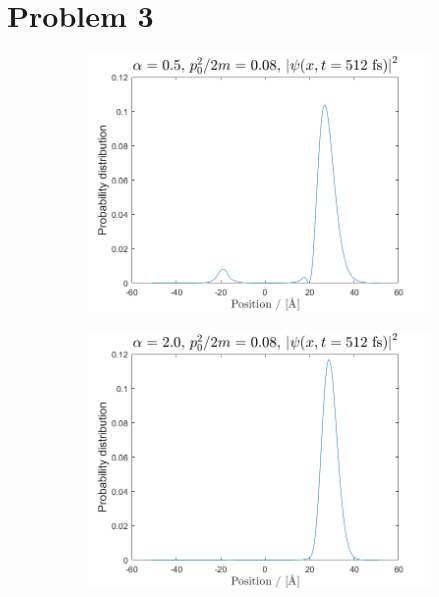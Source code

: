 \section*{Problem 3}

\begin{figure}[H]

\centering
\begin{subfigure}[t]{0.47\textwidth}
	\includegraphics[width=\textwidth]{graphics/task3/a1e1.png}
	\caption{}
	\label{fig:3_a}
\end{subfigure}
\begin{subfigure}[t]{0.47\textwidth}
	\includegraphics[width=\textwidth]{graphics/task3/a2e1.png}
	\caption{}
	\label{fig:3_b}
\end{subfigure}


\end{figure}
